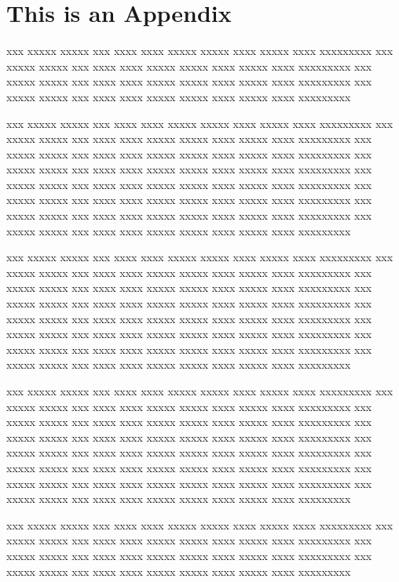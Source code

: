  
\appendix
{}
\chapter{This is an Appendix}
 
xxx xxxxx xxxxx xxx xxxx xxxx xxxxx xxxxx xxxx xxxxx xxxx xxxxxxxxx
xxx xxxxx xxxxx xxx xxxx xxxx xxxxx xxxxx xxxx xxxxx xxxx xxxxxxxxx
xxx xxxxx xxxxx xxx xxxx xxxx xxxxx xxxxx xxxx xxxxx xxxx xxxxxxxxx
xxx xxxxx xxxxx xxx xxxx xxxx xxxxx xxxxx xxxx xxxxx xxxx xxxxxxxxx
 
xxx xxxxx xxxxx xxx xxxx xxxx xxxxx xxxxx xxxx xxxxx xxxx xxxxxxxxx
xxx xxxxx xxxxx xxx xxxx xxxx xxxxx xxxxx xxxx xxxxx xxxx xxxxxxxxx
xxx xxxxx xxxxx xxx xxxx xxxx xxxxx xxxxx xxxx xxxxx xxxx xxxxxxxxx
xxx xxxxx xxxxx xxx xxxx xxxx xxxxx xxxxx xxxx xxxxx xxxx xxxxxxxxx
xxx xxxxx xxxxx xxx xxxx xxxx xxxxx xxxxx xxxx xxxxx xxxx xxxxxxxxx
xxx xxxxx xxxxx xxx xxxx xxxx xxxxx xxxxx xxxx xxxxx xxxx xxxxxxxxx
xxx xxxxx xxxxx xxx xxxx xxxx xxxxx xxxxx xxxx xxxxx xxxx xxxxxxxxx
xxx xxxxx xxxxx xxx xxxx xxxx xxxxx xxxxx xxxx xxxxx xxxx xxxxxxxxx
 
xxx xxxxx xxxxx xxx xxxx xxxx xxxxx xxxxx xxxx xxxxx xxxx xxxxxxxxx
xxx xxxxx xxxxx xxx xxxx xxxx xxxxx xxxxx xxxx xxxxx xxxx xxxxxxxxx
xxx xxxxx xxxxx xxx xxxx xxxx xxxxx xxxxx xxxx xxxxx xxxx xxxxxxxxx
xxx xxxxx xxxxx xxx xxxx xxxx xxxxx xxxxx xxxx xxxxx xxxx xxxxxxxxx
xxx xxxxx xxxxx xxx xxxx xxxx xxxxx xxxxx xxxx xxxxx xxxx xxxxxxxxx
xxx xxxxx xxxxx xxx xxxx xxxx xxxxx xxxxx xxxx xxxxx xxxx xxxxxxxxx
xxx xxxxx xxxxx xxx xxxx xxxx xxxxx xxxxx xxxx xxxxx xxxx xxxxxxxxx
xxx xxxxx xxxxx xxx xxxx xxxx xxxxx xxxxx xxxx xxxxx xxxx xxxxxxxxx
 
xxx xxxxx xxxxx xxx xxxx xxxx xxxxx xxxxx xxxx xxxxx xxxx xxxxxxxxx
xxx xxxxx xxxxx xxx xxxx xxxx xxxxx xxxxx xxxx xxxxx xxxx xxxxxxxxx
xxx xxxxx xxxxx xxx xxxx xxxx xxxxx xxxxx xxxx xxxxx xxxx xxxxxxxxx
xxx xxxxx xxxxx xxx xxxx xxxx xxxxx xxxxx xxxx xxxxx xxxx xxxxxxxxx
xxx xxxxx xxxxx xxx xxxx xxxx xxxxx xxxxx xxxx xxxxx xxxx xxxxxxxxx
xxx xxxxx xxxxx xxx xxxx xxxx xxxxx xxxxx xxxx xxxxx xxxx xxxxxxxxx
xxx xxxxx xxxxx xxx xxxx xxxx xxxxx xxxxx xxxx xxxxx xxxx xxxxxxxxx
xxx xxxxx xxxxx xxx xxxx xxxx xxxxx xxxxx xxxx xxxxx xxxx xxxxxxxxx
 
xxx xxxxx xxxxx xxx xxxx xxxx xxxxx xxxxx xxxx xxxxx xxxx xxxxxxxxx
xxx xxxxx xxxxx xxx xxxx xxxx xxxxx xxxxx xxxx xxxxx xxxx xxxxxxxxx
xxx xxxxx xxxxx xxx xxxx xxxx xxxxx xxxxx xxxx xxxxx xxxx xxxxxxxxx
xxx xxxxx xxxxx xxx xxxx xxxx xxxxx xxxxx xxxx xxxxx xxxx xxxxxxxxx
